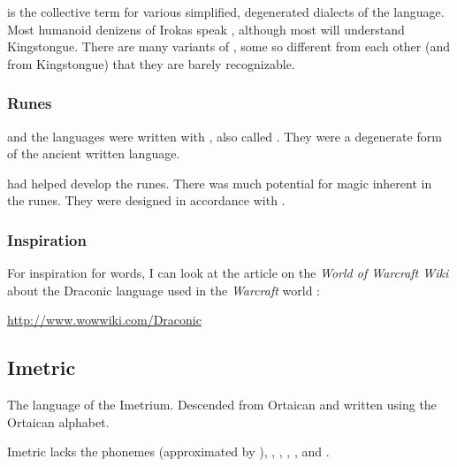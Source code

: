 \subsubsection{\CommonDraconic}
\quo{\CommonDraconic} is the collective term for various simplified, degenerated dialects of the language. 
Most humanoid denizens of Irokas speak \CommonDraconic, although most will understand Kingstongue. 
There are many variants of \CommonDraconic, some so different from each other (and from Kingstongue) that they are barely recognizable. 





\subsubsection{Runes}
\Draconic and the \quiljaaran languages were written with , also called .
They were a degenerate form of the ancient \ophidian written language.

\Sethicus had helped develop the runes. 
There was much potential for magic inherent in the runes. 
They were designed in accordance with . 





\subsubsection{Inspiration}
For inspiration for \Draconic words, I can look at the article on the \emph{World of Warcraft Wiki} about the Draconic language used in the \emph{Warcraft} world \cite{VideoGame:Warcraft}: 

\href{http://www.wowwiki.com/Draconic}{http://www.wowwiki.com/Draconic}









\subsection{Imetric}
The language of the Imetrium. 
Descended from Ortaican and written using the Ortaican alphabet. 

Imetric lacks the phonemes \txipa{[b]} (approximated by \txipa{[v]}), \txipa{[T]}, \txipa{[x]}, \txipa{[\c c]}, \txipa{[S]}, \txipa{[z]} and \txipa{[Z]}. 




